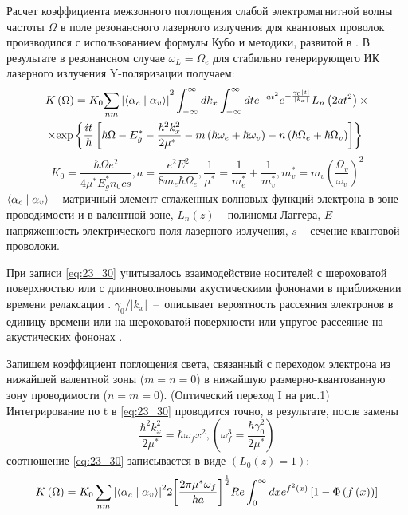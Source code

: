 {Расчет коэффициента межзонного поглощения слабой электромагнитной волны частоты $\Omega$ в поле резонансного лазерного излучения для квантовых проволок производился с использованием формулы Кубо \cite{Kubo1957a} и методики, развитой в \cite{Sinyavskii1974}. В результате в резонансном случае ${\omega }_L=\Omega_e$ для стабильно генерирующего ИК лазерного излучения Y-поляризации получаем:
\begin{multline} \label{eq:23_30}
K\left(\Omega\right)=K_0{\sum_{nm}{\left|\left\langle {\alpha }_c\mathrel{\left|\vphantom{{\alpha }_c {\alpha }_v}\right.\kern-\nulldelimiterspace}{\alpha }_v\right\rangle \right|}}^2\int^{\infty }_{-\infty }{dk_x}\int^{\infty }_{-\infty }{dt}e^{-at^2}e^{-\frac{{\gamma }_0\left|t\right|}{\left|k_x\right|}}L_n\left(2at^2\right)\times\\
\times {\exp \left\{\frac{it}{\hbar }\left[\hbar \Omega-E^*_g-\frac{{\hbar }^2k^2_x}{2{\mu }^*\ }-m\left(\hbar {\omega }_e+\hbar {\omega }_v\right)-n\left(\hbar \Omega_e+\hbar \Omega_v\right)\right]\right\}\ }
\end{multline}
\[
K_0=\frac{\hbar \Omega e^2}{4{\mu }^*E^*_gn_0cs}, 
a=\frac{e^2E^2}{8m_e\hbar \Omega_e}, \frac{1}{{\mu }^*}=\frac{1}{m^*_e}+\frac{1}{m^*_v}, m^*_v=m_v{\left(\frac{\Omega_v}{{\omega }_v}\right)}^2
\] 
$\left\langle {\alpha }_c\mathrel{\left|\vphantom{{\alpha }_c {\alpha }_v}\right.\kern-\nulldelimiterspace}{\alpha }_v\right\rangle $ -- матричный элемент сглаженных волновых функций электрона в зоне проводимости и в валентной зоне, $L_n\left(z\right)$ -- полиномы Лаггера, $E$ -- напряженность электрического поля лазерного излучения, $s$ -- сечение квантовой проволоки. 

При записи \eqref{eq:23_30} учитывалось взаимодействие носителей с шероховатой поверхностью или с длинноволновыми акустическими фононами в приближении времени релаксации \cite{Khamidullin2002}. ${{\gamma }_0}/{\left|k_x\right|}$~--~описывает вероятность рассеяния электронов в единицу времени или на шероховатой поверхности \cite{Karapetyan2012} или упругое рассеяние на акустических фононах \cite{Khamidullin2006}.

Запишем коэффициент поглощения света, связанный с переходом электрона из нижайшей валентной зоны ($m=n=0$) в нижайшую размерно-квантованную зону проводимости ($n=m=0$). (Оптический переход I на рис.1) Интегрирование по t в  \eqref{eq:23_30} проводится точно, в результате, после замены
\[
\frac{{\hbar }^2k^2_x}{2{\mu }^*}=\hbar {\omega }_fx^2, \left({\omega }^3_f=\frac{\hbar {\gamma }^2_0}{2{\mu }^*}\right)
\] 
соотношение  \eqref{eq:23_30} записывается в виде $\left(L_0\left(z\right)=1\right)$:
\begin{equation} \label{eq:23_40}
K\left(\Omega\right)=K_0\sum_{nm}{{\left|\left\langle {\alpha }_c\mathrel{\left|\vphantom{{\alpha }_c {\alpha }_v}\right.\kern-\nulldelimiterspace}{\alpha }_v\right\rangle \right|}^2}2{\left[\frac{2\pi {\mu }^*{\omega }_f}{\hbar a}\right]}^{\frac{1}{2}}Re\int^{\infty }_0{dx}e^{f^2\left(x\right)}\left[1-\Phi \left(f\left(x\right)\right)\right]
\end{equation}

}

